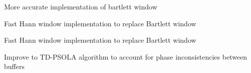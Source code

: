 
\begin{DoxyRefList}
\item[\label{todo__todo000003}%
\hypertarget{todo__todo000003}{}%
Member \hyperlink{class_p_s_o_l_a_a040472615313356939713eb7a4c99106}{P\+S\+O\+L\+A\+:\+:bartlett} (int $\ast$window, int length)]More accurate implementation of bartlett window

Fast Hann window implementation to replace Bartlett window 
\item[\label{todo__todo000002}%
\hypertarget{todo__todo000002}{}%
Member \hyperlink{class_p_s_o_l_a_a057fb777dc9ca7cdf514230eee2c47b1}{P\+S\+O\+L\+A\+:\+:pitch\+Correct} (int $\ast$input, int Fs, float input\+Pitch, float desired\+Pitch)]Fast Hann window implementation to replace Bartlett window 
\item[\label{todo__todo000001}%
\hypertarget{todo__todo000001}{}%
Member \hyperlink{class_p_s_o_l_a_ae27c27445ea2dc9b9f109234c8ea477e}{P\+S\+O\+L\+A\+:\+:P\+S\+O\+L\+A} (int buffer\+Len)]Improve to T\+D-\/\+P\+S\+O\+L\+A algorithm to account for phase inconsistencies between buffers
\end{DoxyRefList}